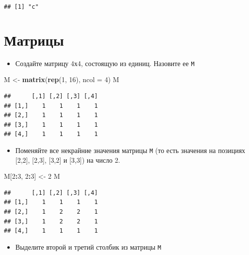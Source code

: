 \documentclass[]{book}
\newenvironment{Shaded}{\begin{snugshade}}{\end{snugshade}}
\newcommand{\DataTypeTok}[1]{\textcolor[rgb]{0.13,0.29,0.53}{#1}}
\newcommand{\DecValTok}[1]{\textcolor[rgb]{0.00,0.00,0.81}{#1}}
\newcommand{\KeywordTok}[1]{\textcolor[rgb]{0.13,0.29,0.53}{\textbf{#1}}}
\newcommand{\NormalTok}[1]{#1}
\newcommand{\OperatorTok}[1]{\textcolor[rgb]{0.81,0.36,0.00}{\textbf{#1}}}
\newcommand{\StringTok}[1]{\textcolor[rgb]{0.31,0.60,0.02}{#1}}
\providecommand{\tightlist}{%
  \setlength{\itemsep}{0pt}\setlength{\parskip}{0pt}}
\begin{document}
\begin{verbatim}
## [1] "c"
\end{verbatim}

\hypertarget{solvt}{%
\section{Матрицы}\label{solvt}}

\begin{itemize}
\tightlist
\item
  Создайте матрицу 4х4, состоящую из единиц. Назовите ее \texttt{M}
\end{itemize}

\begin{Shaded}
\begin{Highlighting}[]
\NormalTok{M <-}\StringTok{ }\KeywordTok{matrix}\NormalTok{(}\KeywordTok{rep}\NormalTok{(}\DecValTok{1}\NormalTok{, }\DecValTok{16}\NormalTok{), }\DataTypeTok{ncol =} \DecValTok{4}\NormalTok{)}
\NormalTok{M}
\end{Highlighting}
\end{Shaded}

\begin{verbatim}
##      [,1] [,2] [,3] [,4]
## [1,]    1    1    1    1
## [2,]    1    1    1    1
## [3,]    1    1    1    1
## [4,]    1    1    1    1
\end{verbatim}

\begin{itemize}
\tightlist
\item
  Поменяйте все некрайние значения матрицы \texttt{M} (то есть значения на позициях {[}2,2{]}, {[}2,3{]}, {[}3,2{]} и {[}3,3{]}) на число 2.
\end{itemize}

\begin{Shaded}
\begin{Highlighting}[]
\NormalTok{M[}\DecValTok{2}\OperatorTok{:}\DecValTok{3}\NormalTok{, }\DecValTok{2}\OperatorTok{:}\DecValTok{3}\NormalTok{] <-}\StringTok{ }\DecValTok{2}
\NormalTok{M}
\end{Highlighting}
\end{Shaded}

\begin{verbatim}
##      [,1] [,2] [,3] [,4]
## [1,]    1    1    1    1
## [2,]    1    2    2    1
## [3,]    1    2    2    1
## [4,]    1    1    1    1
\end{verbatim}

\begin{itemize}
\tightlist
\item
  Выделите второй и третий столбик из матрицы \texttt{M}
\end{itemize}
\end{document}
